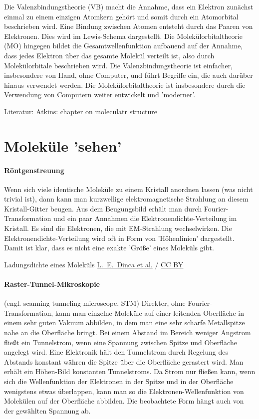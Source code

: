 Die Valenzbindungstheorie (VB) macht die Annahme, dass ein Elektron zunächst einmal zu einem einzigen Atomkern gehört und somit durch ein Atomorbital beschrieben wird. Eine Bindung zwischen Atomen entsteht durch das Paaren von Elektronen. Dies wird im Lewis-Schema dargestellt. Die Molekülorbitaltheorie (MO) hingegen bildet die Gesamtwellenfunktion aufbauend auf der Annahme, dass jedes Elektron über das gesamte Molekül verteilt ist, also durch Molekülorbitale beschrieben wird. Die Valenzbindungstheorie ist einfacher, insbesondere von Hand, ohne Computer, und führt Begriffe ein, die auch darüber hinaus verwendet werden. Die Molekülorbitaltheorie ist insbesondere durch die Verwendung von Computern weiter entwickelt und 'moderner'.


Literatur: Atkins: chapter on moleculatr structure

\section{Moleküle 'sehen'}

\paragraph{Röntgenstreuung} Wenn sich viele identische Moleküle zu einem Kristall anordnen lassen (was nicht trivial ist), dann kann man kurzwellige elektromagnetische Strahlung an diesem  Kristall-Gitter beugen. Aus dem Beugungsbild erhält man durch Fourier-Transformation und ein paar Annahmen die Elektronendichte-Verteilung im Kristall. Es sind die Elektronen, die mit EM-Strahlung wechselwirken. Die Elektronendichte-Verteilung wird oft in Form von 'Höhenlinien' dargestellt. Damit ist klar, dass es nicht eine exakte 'Größe' eines Moleküls gibt.

\begin{marginfigure}
\caption{Ladungsdichte eines Moleküls
\href{https://commons.wikimedia.org/wiki/File:Pentacene_on_Ni(111)_STM.jpg}{L.~E.~Dinca et al.}  / \href{https://creativecommons.org/licenses/by/4.0}{CC BY}
}
\end{marginfigure}


\paragraph{Raster-Tunnel-Mikroskopie} (engl. scanning tunneling microscope, STM) Direkter, ohne Fourier-Transformation, kann man einzelne Moleküle auf einer leitenden Oberfläche in einem sehr guten Vakuum abbilden, in dem man eine sehr scharfe Metallspitze nahe an die Oberfläche bringt. Bei einem Abstand im Bereich weniger Angstrom fließt ein Tunnelstrom, wenn eine Spannung zwischen Spitze und Oberfläche angelegt wird. Eine Elektronik hält den Tunnelstrom durch Regelung des Abstands konstant währen die Spitze über die Oberfläche gerastert wird. Man erhält ein Höhen-Bild konstanten Tunnelstroms. Da Strom nur fließen kann, wenn sich die Wellenfunktion der Elektronen in der Spitze und in der Oberfläche wenigstens etwas überlappen, kann man so die Elektronen-Wellenfunktion von Molekülen auf der Oberfläche abbilden. Die beobachtete Form hängt auch von der gewählten Spannung ab.

